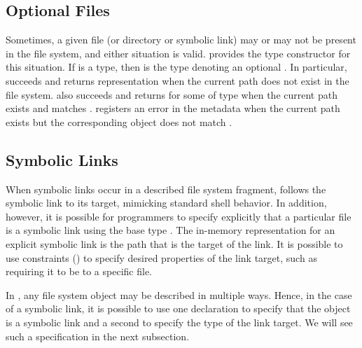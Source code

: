 \subsection{Optional Files}
\label{sec:maybe}
Sometimes, a given file (or directory or symbolic link) may or may not
be present in the file system, and either situation is valid.
\forest{} provides the  type constructor for this
situation.  If  is a \forest{} type, then  is the
\forest{} type denoting an optional .  In particular, 
 succeeds and returns representation  when the
current path does not exist in the file system.   also
succeeds and returns  for some  of type  
when the current path exists and matches .  
registers an error in the metadata when the current path exists but
the corresponding object does not match . 

\subsection{Symbolic Links}
\label{sec:symlinks}
When symbolic links occur in a described file system fragment,
\forest{} follows the symbolic link to its target, mimicking 
standard shell behavior.    In addition, however, it is possible
for programmers to specify explicitly that a particular file is a
symbolic link using the base type .  The in-memory
representation for an explicit symbolic link is the path that is the
target of the link.  It is possible to use constraints
() to specify desired properties of the link
target, such as requiring it to be to a specific file.

In \forest{}, any file system object may be described in multiple ways.
Hence, in the case of a symbolic link, it is possible to use one declaration to
specify that the object is a symbolic link and a second to specify
the type of the link target.  We will see such a specification in the
next subsection. 


